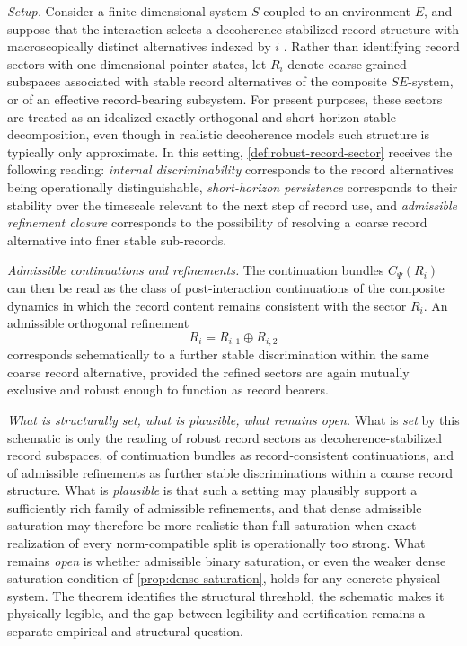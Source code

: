 \documentclass[11pt]{article}
\theoremstyle{remark}
\numberwithin{equation}{section}
\newcommand{\Cpsi}[1]{C_{\Psi}\!\left(#1\right)}
\begin{document}
\emph{Setup.}
Consider a finite-dimensional system $S$ coupled to an environment
$E$, and suppose that the interaction selects a decoherence-stabilized
record structure with macroscopically distinct alternatives indexed by
$i$ \cite{Zurek2003Decoherence,Schlosshauer2007Decoherence}.
Rather than identifying record sectors with one-dimensional
pointer states, let $R_i$ denote coarse-grained subspaces associated
with stable record alternatives of the composite $SE$-system, or of an
effective record-bearing subsystem. For present purposes, these
sectors are treated as an idealized exactly orthogonal and
short-horizon stable decomposition, even though in realistic
decoherence models such structure is typically only approximate.
In this setting,
\cref{def:robust-record-sector} receives the following reading:
\emph{internal discriminability} corresponds to the record alternatives
being operationally distinguishable, \emph{short-horizon persistence}
corresponds to their stability over the timescale relevant to the next
step of record use, and \emph{admissible refinement closure}
corresponds to the possibility of resolving a coarse record
alternative into finer stable sub-records.

\emph{Admissible continuations and refinements.}
The continuation bundles $\Cpsi{R_i}$ can then be read as the class of
post-interaction continuations of the composite dynamics in which the
record content remains consistent with the sector $R_i$. An admissible
orthogonal refinement
\[
R_i = R_{i,1} \oplus R_{i,2}
\]
corresponds schematically to a further stable discrimination within
the same coarse record alternative, provided the refined sectors are
again mutually exclusive and robust enough to function as record
bearers.

\emph{What is structurally set, what is plausible, what remains open.}
What is \emph{set} by this schematic is only the reading of robust
record sectors as decoherence-stabilized record subspaces, of
continuation bundles as record-consistent continuations, and of
admissible refinements as further stable discriminations within a
coarse record structure.
What is \emph{plausible} is that such a
setting may plausibly support a sufficiently rich family of admissible
refinements,
and that dense admissible saturation may therefore be
more realistic than full saturation when exact realization of every
norm-compatible split is operationally too strong. What remains
\emph{open} is whether admissible binary saturation, or even the
weaker dense saturation condition of \cref{prop:dense-saturation},
holds for any concrete physical system. The theorem identifies the
structural threshold, the schematic makes it physically legible, and
the gap between legibility and certification remains a separate
empirical and structural question.
\end{document}
